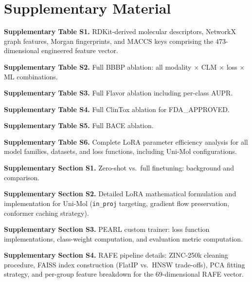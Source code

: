\documentclass[9pt,twocolumn,conference]{IEEEtran}
\begin{document}
\section*{Supplementary Material}

\noindent\textbf{Supplementary Table S1.} RDKit-derived molecular descriptors, NetworkX graph
features, Morgan fingerprints, and MACCS keys comprising the 473-dimensional engineered
feature vector.

\noindent\textbf{Supplementary Table S2.} Full BBBP ablation: all modality $\times$ CLM $\times$
loss $\times$ ML combinations.

\noindent\textbf{Supplementary Table S3.} Full Flavor ablation including per-class AUPR.

\noindent\textbf{Supplementary Table S4.} Full ClinTox ablation for FDA\_APPROVED.

\noindent\textbf{Supplementary Table S5.} Full BACE ablation.

\noindent\textbf{Supplementary Table S6.} Complete LoRA parameter efficiency analysis for all
model families, datasets, and loss functions, including Uni-Mol configurations.

\noindent\textbf{Supplementary Section S1.} Zero-shot vs.\ full finetuning: background and
comparison.

\noindent\textbf{Supplementary Section S2.} Detailed LoRA mathematical formulation and
implementation for Uni-Mol (\texttt{in\_proj} targeting, gradient flow preservation,
conformer caching strategy).

\noindent\textbf{Supplementary Section S3.} PEARL custom trainer: loss function
implementations, class-weight computation, and evaluation metric computation.

\noindent\textbf{Supplementary Section S4.} RAFE pipeline details: ZINC-250k cleaning
procedure, FAISS index construction (FlatIP vs.\ HNSW trade-offs), PCA fitting strategy,
and per-group feature breakdown for the 69-dimensional RAFE vector.



%
%
%
\footnotesize{


}

\end{document}
